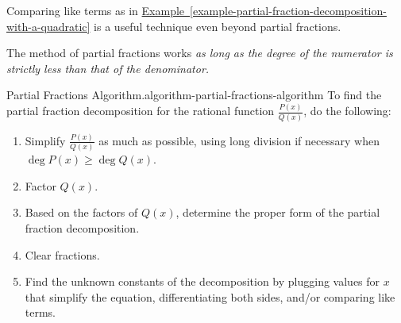 \documentclass[10pt,]{book}
\numberwithin{equation}{section}
\begin{document}
\hypertarget{p-564}{}%
Comparing like terms as in \hyperref[example-partial-fraction-decomposition-with-a-quadratic]{Example~\ref{example-partial-fraction-decomposition-with-a-quadratic}} is a useful technique even beyond partial fractions.%
\par
\hypertarget{p-565}{}%
The method of partial fractions works \emph{as long as the degree of the numerator is strictly less than that of the denominator.}%
\begin{algorithm}{Partial Fractions Algorithm.}{}{algorithm-partial-fractions-algorithm}%
\hypertarget{p-566}{}%
To find the partial fraction decomposition for the rational function \(\frac{P(x)}{Q(x)}\), do the following: \leavevmode%
\begin{enumerate}
\item\hypertarget{li-47}{}Simplify \(\frac{P(x)}{Q(x)}\) as much as possible, using long division if necessary when \(\deg P(x) \geq \deg Q(x)\).%
\item\hypertarget{li-48}{}Factor \(Q(x)\).%
\item\hypertarget{li-49}{}Based on the factors of \(Q(x)\), determine the proper form of the partial fraction decomposition.%
\item\hypertarget{li-50}{}Clear fractions.%
\item\hypertarget{li-51}{}Find the unknown constants of the decomposition by plugging values for \(x\) that simplify the equation, differentiating both sides, and/or comparing like terms.%
\end{enumerate}
%
\end{algorithm}
\end{document}

